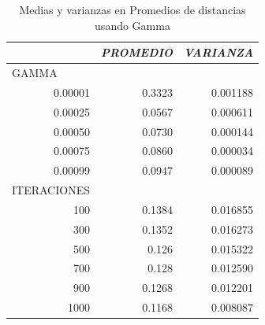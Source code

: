 \begin{table}[h]
\centering
\caption{Medias y varianzas en Promedios de distancias usando Gamma}
\begin{tabular}{rrr}
\multicolumn{1}{l}{}            & \multicolumn{1}{c}{\textit{\textbf{PROMEDIO}}} & \multicolumn{1}{c}{\textit{\textbf{VARIANZA}}} \\ \hline
\multicolumn{1}{l}{GAMMA}     & \multicolumn{1}{l}{}                           & \multicolumn{1}{l}{}                           \\
0.00001                         & 0.3323                                         & 0.001188                                       \\
0.00025                         & 0.0567                                         & 0.000611                                       \\
0.00050                         & 0.0730                                         & 0.000144                                       \\
0.00075                         & 0.0860                                         & 0.000034                                       \\
0.00099                         & 0.0947                                         & 0.000089                                       \\
\multicolumn{1}{l}{ITERACIONES}  & \multicolumn{1}{l}{}                           & \multicolumn{1}{l}{}                           \\
100                             & 0.1384                                         & 0.016855                                       \\
300                             & 0.1352                                         & 0.016273                                       \\
500                             & 0.126                                          & 0.015322                                       \\
700                             & 0.128                                          & 0.012590                                       \\
900                             & 0.1268                                         & 0.012201                                       \\
1000                            & 0.1168                                         & 0.008087 \\ \hline                                   
\end{tabular}
\label{media_var_1}
\end{table}

